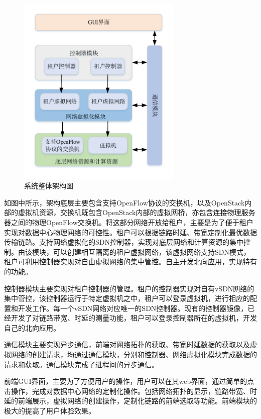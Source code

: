 \begin{figure}[!htb]
  \centering
  \includegraphics[width=0.7\textwidth]{logo/architecture-a}
  \caption{系统整体架构图}
  \label{fig:artic}
\end{figure}

如图中所示，架构底层主要包含支持OpenFlow协议的交换机，以及OpenStack内部的虚拟机资源，交换机既包含OpenStack内部的虚拟网桥，亦包含连接物理服务器之间的物理OpenFlow交换机。将这部分网络开放给租户，主要是为了便于租户实现对数据中心物理网络的可控性。租户可以根据链路时延、带宽定制化最优数据传输链路。支持网络虚拟化的SDN控制器，实现对底层网络和计算资源的集中控制。由该模块，可以创建相互隔离的租户虚拟网络，该虚拟网络支持SDN模式，租户可利用控制器实现对自由虚拟网络的集中管控。自主开发北向应用，实现特有的功能。

控制器模块主要实现对租户控制器的管理。租户的控制器实现对自有vSDN网络的集中管控，该控制器运行于特定虚拟机之中，租户可以登录虚拟机，进行相应的配置和开发工作。每一个vSDN网络对应唯一的SDN控制器。现有的控制器镜像，已经开发了对链路带宽、时延的测量功能，租户可以登录控制器所在的虚拟机，开发自己的北向应用。

通信模块主要实现异步通信，前端对网络拓扑的获取、带宽时延数据的获取以及虚拟网络的创建请求，均通过通信模块，分别和控制器、网络虚拟化模块完成数据的请求和获取。通信模块完成了进程间的异步通信。

前端GUI界面，主要为了方便用户的操作，用户可以在其web界面，通过简单的点击操作，完成对数据中心网络的定制化操作。包括网络拓扑的显示，链路带宽、时延的前端展示，虚拟网络的创建操作，定制化链路的前端选取等功能。前端模块的极大的提高了用户体验效果。

